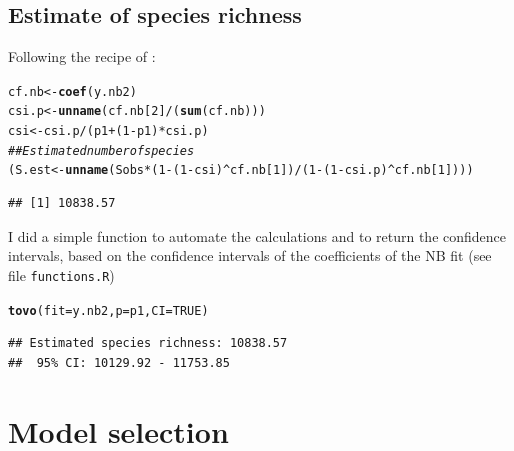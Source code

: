 \documentclass[12pt, A4]{article}\usepackage[]{graphicx}\usepackage[]{color}
\makeatletter
\newcommand{\hlnum}[1]{\textcolor[rgb]{0.686,0.059,0.569}{#1}}%
\newcommand{\hlcom}[1]{\textcolor[rgb]{0.678,0.584,0.686}{\textit{#1}}}%
\newcommand{\hlopt}[1]{\textcolor[rgb]{0,0,0}{#1}}%
\newcommand{\hlstd}[1]{\textcolor[rgb]{0.345,0.345,0.345}{#1}}%
\newcommand{\hlkwb}[1]{\textcolor[rgb]{0.69,0.353,0.396}{#1}}%
\newcommand{\hlkwc}[1]{\textcolor[rgb]{0.333,0.667,0.333}{#1}}%
\newcommand{\hlkwd}[1]{\textcolor[rgb]{0.737,0.353,0.396}{\textbf{#1}}}%
\newenvironment{kframe}{%
 \def\at@end@of@kframe{}%
 \ifinner\ifhmode%
  \def\at@end@of@kframe{\end{minipage}}%
  \begin{minipage}{\columnwidth}%
 \fi\fi%
 \def\FrameCommand##1{\hskip\@totalleftmargin \hskip-\fboxsep
 \colorbox{shadecolor}{##1}\hskip-\fboxsep
     \hskip-\linewidth \hskip-\@totalleftmargin \hskip\columnwidth}%
 \MakeFramed {\advance\hsize-\width
   \@totalleftmargin\z@ \linewidth\hsize
   \@setminipage}}%
 {\par\unskip\endMakeFramed%
 \at@end@of@kframe}
\newenvironment{knitrout}{}{} %
\newcommand{\code}[1]{\texttt{#1}}
\makeatother
\begin{document}
\subsection*{Estimate of  species richness}

Following the recipe of \citet{tovo2017}:

 
\begin{knitrout}
\color{fgcolor}\begin{kframe}
\begin{alltt}
\hlstd{cf.nb} \hlkwb{<-} \hlkwd{coef}\hlstd{(y.nb2)}
\hlstd{csi.p} \hlkwb{<-} \hlkwd{unname}\hlstd{(cf.nb[}\hlnum{2}\hlstd{]}\hlopt{/}\hlstd{(}\hlkwd{sum}\hlstd{(cf.nb)))}
\hlstd{csi} \hlkwb{<-} \hlstd{csi.p}\hlopt{/}\hlstd{(p1}\hlopt{+}\hlstd{(}\hlnum{1}\hlopt{-}\hlstd{p1)}\hlopt{*}\hlstd{csi.p)}
\hlcom{## Estimated number of species }
\hlstd{(S.est} \hlkwb{<-} \hlkwd{unname}\hlstd{(Sobs}\hlopt{*}\hlstd{(}\hlnum{1}\hlopt{-}\hlstd{(}\hlnum{1}\hlopt{-}\hlstd{csi)}\hlopt{^}\hlstd{cf.nb[}\hlnum{1}\hlstd{])} \hlopt{/} \hlstd{(}\hlnum{1}\hlopt{-}\hlstd{(}\hlnum{1}\hlopt{-}\hlstd{csi.p)}\hlopt{^}\hlstd{cf.nb[}\hlnum{1}\hlstd{])))}
\end{alltt}
\begin{verbatim}
## [1] 10838.57
\end{verbatim}
\end{kframe}
\end{knitrout}

I did a simple function to automate the calculations and to return
the confidence intervals, based on the confidence intervals of the 
coefficients of the NB fit (see file \code{functions.R})

 
\begin{knitrout}
\color{fgcolor}\begin{kframe}
\begin{alltt}
\hlkwd{tovo}\hlstd{(}\hlkwc{fit} \hlstd{= y.nb2,} \hlkwc{p} \hlstd{= p1,} \hlkwc{CI}\hlstd{=}\hlnum{TRUE}\hlstd{)}
\end{alltt}
\begin{verbatim}
## Estimated species richness: 10838.57 
##  95% CI: 10129.92 - 11753.85
\end{verbatim}
\end{kframe}
\end{knitrout}


\section*{Model selection}
\end{document}
